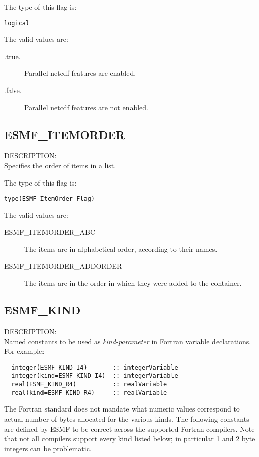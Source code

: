 The type of this flag is:

{\tt logical}

The valid values are:
\begin{description}
\item [.true.]
      Parallel netcdf features are enabled.
\item [.false.]
      Parallel netcdf features are not enabled.
\end{description}


\subsection{ESMF\_ITEMORDER}
\label{const:itemorderflag}
{\sf DESCRIPTION:\\}  
Specifies the order of items in a list.

The type of this flag is:

{\tt type(ESMF\_ItemOrder\_Flag)}

The valid values are:
\begin{description}

\item [ESMF\_ITEMORDER\_ABC]
         The items are in alphabetical order, according to their names.
\item [ESMF\_ITEMORDER\_ADDORDER]
         The items are in the order in which they were added to the container.
\end{description}


\subsection{ESMF\_KIND}
\label{const:kind}

{\sf DESCRIPTION:\\}
Named constants to be used as {\em kind-parameter} in Fortran variable
 declarations. For example:
\begin{verbatim}
  integer(ESMF_KIND_I4)       :: integerVariable
  integer(kind=ESMF_KIND_I4)  :: integerVariable
  real(ESMF_KIND_R4)          :: realVariable
  real(kind=ESMF_KIND_R4)     :: realVariable
\end{verbatim}
The Fortran standard does not mandate what numeric values correspond to
actual number of bytes allocated for the various kinds. The following constants
are defined by ESMF to be correct across the supported Fortran compilers.
Note that not all compilers support every kind listed below; in particular
1 and 2 byte integers can be problematic.

